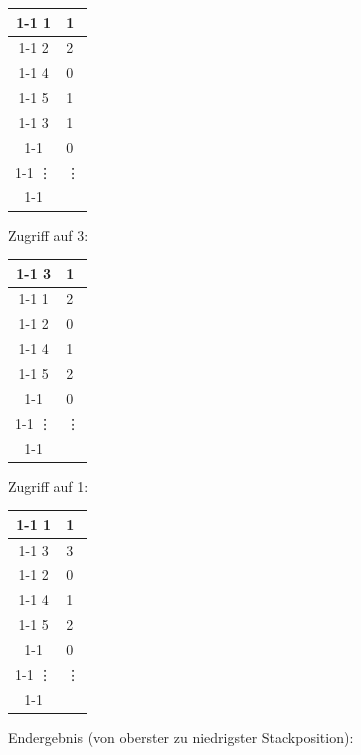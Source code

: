 \begin{enumerate}[a)]
\begin{solution}
\begin{minipage}{0.22\textwidth}
        \begin{tabular}{ | c | l}
        	\cline{1-1}
        	1      & 1      \\ \cline{1-1}
        	2      & 2      \\ \cline{1-1}
        	4      & 0      \\ \cline{1-1}
        	5      & 1      \\ \cline{1-1}
        	3      & 1      \\ \cline{1-1}
        	       & 0      \\ \cline{1-1}
        	\vdots & \vdots \\ \cline{1-1}
        \end{tabular}
    \end{minipage}
    \begin{minipage}{0.22\textwidth}
        \center
        Zugriff auf 3:

        \begin{tabular}{ | c | l}
        	\cline{1-1}
        	3      & 1      \\ \cline{1-1}
        	1      & 2      \\ \cline{1-1}
        	2      & 0      \\ \cline{1-1}
        	4      & 1      \\ \cline{1-1}
        	5      & 2      \\ \cline{1-1}
        	       & 0      \\ \cline{1-1}
        	\vdots & \vdots \\ \cline{1-1}
        \end{tabular}
    \end{minipage}

        \begin{minipage}{0.28\textwidth}
            \center
            Zugriff auf 1:

            \begin{tabular}{ | c | l}
            	\cline{1-1}
            	1      & 1      \\ \cline{1-1}
            	3      & 3      \\ \cline{1-1}
            	2      & 0      \\ \cline{1-1}
            	4      & 1      \\ \cline{1-1}
            	5      & 2      \\ \cline{1-1}
            	       & 0      \\ \cline{1-1}
            	\vdots & \vdots \\ \cline{1-1}
            \end{tabular}
        \end{minipage}
        \begin{minipage}{0.65\textwidth}
            Endergebnis (von oberster zu niedrigster Stackposition):


\end{minipage}
\end{solution}
\end{enumerate}
